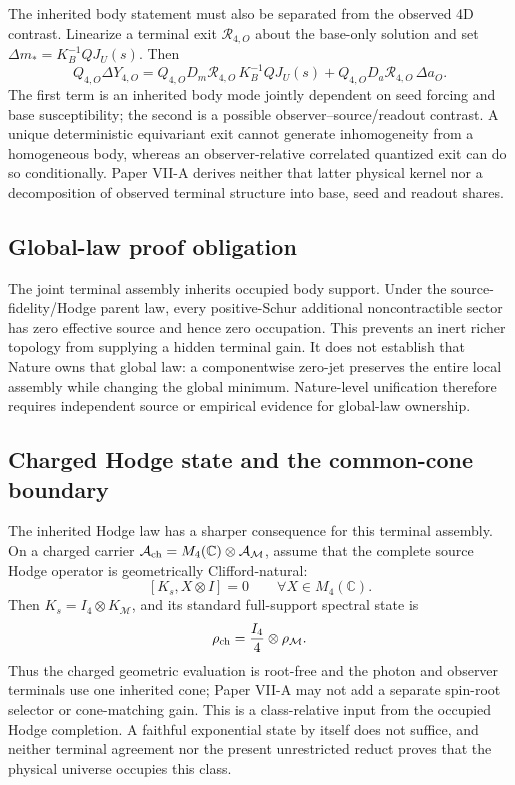 \documentclass[11pt]{article}
\begin{document}
The inherited body statement must also be separated from the observed 4D
contrast. Linearize a terminal exit $\mathcal R_{4,O}$ about the base-only
solution and set $\Delta m_*=K_B^{-1}QJ_U(s)$. Then
\begin{equation}
 Q_{4,O}\Delta Y_{4,O}
 =Q_{4,O}D_m\mathcal R_{4,O}\,K_B^{-1}QJ_U(s)
 +Q_{4,O}D_a\mathcal R_{4,O}\,\Delta a_O.
 \label{eq:paper-vii-four-d-inhomogeneity-ledger}
\end{equation}
The first term is an inherited body mode jointly dependent on seed forcing
and base susceptibility; the second is a possible observer--source/readout
contrast. A unique deterministic equivariant exit cannot generate
inhomogeneity from a homogeneous body, whereas an observer-relative
correlated quantized exit can do so conditionally. Paper VII-A derives
neither that latter physical kernel nor a decomposition of observed terminal
structure into base, seed and readout shares.

\subsection*{Global-law proof obligation}

The joint terminal assembly inherits occupied body support.  Under the
source-fidelity/Hodge parent law, every positive-Schur additional
noncontractible sector has zero effective source and hence zero occupation.
This prevents an inert richer topology from supplying a hidden terminal gain.
It does not establish that Nature owns that global law: a componentwise
zero-jet preserves the entire local assembly while changing the global
minimum.  Nature-level unification therefore requires independent source or
empirical evidence for global-law ownership.

\subsection*{Charged Hodge state and the common-cone boundary}

The inherited Hodge law has a sharper consequence for this terminal
assembly.  On a charged carrier
\(\mathcal A_{\rm ch}=M_4(\mathbb C)\otimes\mathcal A_{\mathcal M}\), assume
that the complete source Hodge operator is geometrically Clifford-natural:
\[
 [K_s,X\otimes I]=0\qquad\forall X\in M_4(\mathbb C).
\]
Then \(K_s=I_4\otimes K_{\mathcal M}\), and its standard full-support
spectral state is
\[
 \rho_{\rm ch}=\frac{I_4}{4}\otimes\rho_{\mathcal M}.
\]
Thus the charged geometric evaluation is root-free and the photon and
observer terminals use one inherited cone; Paper VII-A may not add a separate
spin-root selector or cone-matching gain.  This is a class-relative input from
the occupied Hodge completion.  A faithful exponential state by itself does
not suffice, and neither terminal agreement nor the present unrestricted
reduct proves that the physical universe occupies this class.
\end{document}
